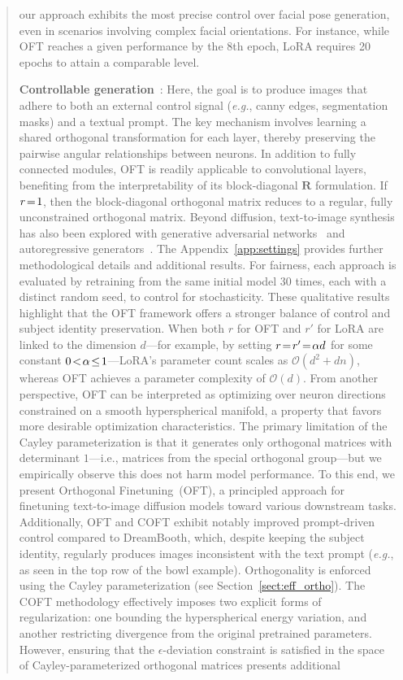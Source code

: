 {\begin{abstract}
our approach exhibits the most precise control over facial pose generation, even in scenarios involving complex facial orientations. For instance, while OFT reaches a given performance by the 8th epoch, LoRA requires 20 epochs to attain a comparable level. \item \textbf{Controllable generation}~\cite{zhang2023adding,mou2023t2i}: Here, the goal is to produce images that adhere to both an external control signal (\emph{e.g.}, canny edges, segmentation masks) and a textual prompt. The key mechanism involves learning a shared orthogonal transformation for each layer, thereby preserving the pairwise angular relationships between neurons. In addition to fully connected modules, OFT is readily applicable to convolutional layers, benefiting from the interpretability of its block-diagonal $\bm{R}$ formulation. If $\thickmuskip=2mu \medmuskip=2mu r=1$, then the block-diagonal orthogonal matrix reduces to a regular, fully unconstrained orthogonal matrix. Beyond diffusion, text-to-image synthesis has also been explored with generative adversarial networks~\cite{reed2016generative,zhang2017stackgan,xu2018attngan,li2019controllable} and autoregressive generators~\cite{ramesh2021zero,ding2021cogview,wu2022nuwa,yuscaling}. The Appendix~\ref{app:settings} provides further methodological details and additional results. For fairness, each approach is evaluated by retraining from the same initial model 30 times, each with a distinct random seed, to control for stochasticity. These qualitative results highlight that the OFT framework offers a stronger balance of control and subject identity preservation. When both $r$ for OFT and $r'$ for LoRA are linked to the dimension $d$—for example, by setting $\thickmuskip=2mu \medmuskip=2mu r=r'=\alpha d$ for some constant $\thickmuskip=2mu \medmuskip=2mu 0<\alpha\leq 1$—LoRA's parameter count scales as $\mathcal{O}(d^2+dn)$, whereas OFT achieves a parameter complexity of $\mathcal{O}(d)$. From another perspective, OFT can be interpreted as optimizing over neuron directions constrained on a smooth hyperspherical manifold, a property that favors more desirable optimization characteristics. The primary limitation of the Cayley parameterization is that it generates only orthogonal matrices with determinant $1$—i.e., matrices from the special orthogonal group—but we empirically observe this does not harm model performance. To this end, we present Orthogonal Finetuning~(OFT), a principled approach for finetuning text-to-image diffusion models toward various downstream tasks. Additionally, OFT and COFT exhibit notably improved prompt-driven control compared to DreamBooth, which, despite keeping the subject identity, regularly produces images inconsistent with the text prompt (\emph{e.g.}, as seen in the top row of the bowl example). Orthogonality is enforced using the Cayley parameterization (see Section~\ref{sect:eff_ortho}). The COFT methodology effectively imposes two explicit forms of regularization: one bounding the hyperspherical energy variation, and another restricting divergence from the original pretrained parameters. However, ensuring that the $\epsilon$-deviation constraint is satisfied in the space of Cayley-parameterized orthogonal matrices presents additional 
\end{abstract}}
